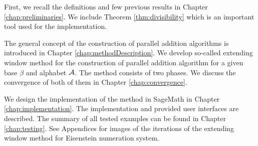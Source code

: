 First, we recall the definitions and few previous results in Chapter \ref{chap:preliminaries}. We include Theorem \ref {thm:divisibility} which is an important tool used for the implementation. 

The general concept of the construction of parallel addition algorithms is introduced in Chapter \ref{chap:methodDescription}. We develop so-called extending window method for the construction of parallel addition algorithm for a given base $\beta$ and alphabet $\mathcal{A}$. The method consists of two phases. We discuss the convergence of both of them in Chapter \ref{chap:convergence}.

We design the implementation of the method in SageMath in Chapter \ref{chap:implementation}. The implementation and provided user interfaces are described. The summary of all tested examples can be found in Chapter \ref{chap:testing}. See Appendices for images of the iterations of the extending window method for Eisenstein numeration system.














